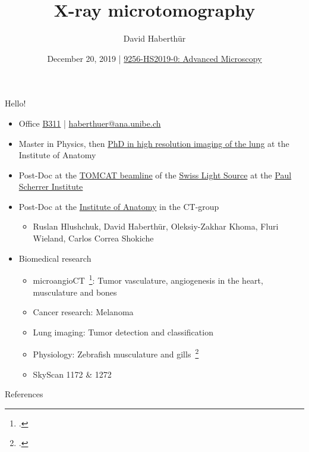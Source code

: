 \documentclass[aspectratio=169,10pt]{beamer}
\title{X-ray microtomography}
\author{David Haberthür}
\institute{Institute of Anatomy\\University of Bern\\Switzerland}
\date{December 20, 2019 | \href{https://ilias.unibe.ch/ilias.php?ref_id=1555744&cmd=infoScreen&cmdClass=ilrepositorygui&cmdNode=y2&baseClass=ilrepositorygui}{9256-HS2019-0: Advanced Microscopy}}
\newcommand{\uct}{\si{\micro}CT\xspace}%
\begin{document}
{%
	\begin{frame}%
		\maketitle
	\end{frame}%
}

\begin{frame}{Hello!}
	\begin{itemize}
		\item Office \href{http://osm.org/go/0CZwlGp3A?m}{B311} | \href{mailto:haberthuer@ana.unibe.ch?subject=Feedback\%20from\%20the\%20(micro)-tomography\%20lecture}{haberthuer@ana.unibe.ch}
		\item Master in Physics, then \href{https://boris.unibe.ch/2619/}{PhD in high resolution imaging of  the lung} at the Institute of Anatomy
		\item Post-Doc at the \href{https://www.psi.ch/sls/tomcat/}{TOMCAT beamline} of the \href{https://www.psi.ch/sls/}{Swiss Light Source} at the \href{https://www.psi.ch/}{Paul Scherrer Institute}
		\item Post-Doc at the \href{https://aan.unibe.ch}{Institute of Anatomy} in the \uct-group
		\begin{itemize}
			\item Ruslan Hlushchuk, David Haberthür, Oleksiy-Zakhar Khoma, Fluri Wieland, Carlos Correa Shokiche
		\end{itemize}			
		\item Biomedical research
		\begin{itemize}
			\item microangioCT~\footcite{Hlushchuk2018}: Tumor vasculature, angiogenesis in the heart, musculature and bones
			\item Cancer research: Melanoma
			\item Lung imaging: Tumor detection and classification
			\item Physiology: Zebrafish musculature and gills~\footcite{Messerli2019}
			\item SkyScan 1172 \& 1272
		\end{itemize}
	\end{itemize}		
\end{frame}

\begin{frame}{References}
	\printbibliography%
\end{frame}
\end{document}
